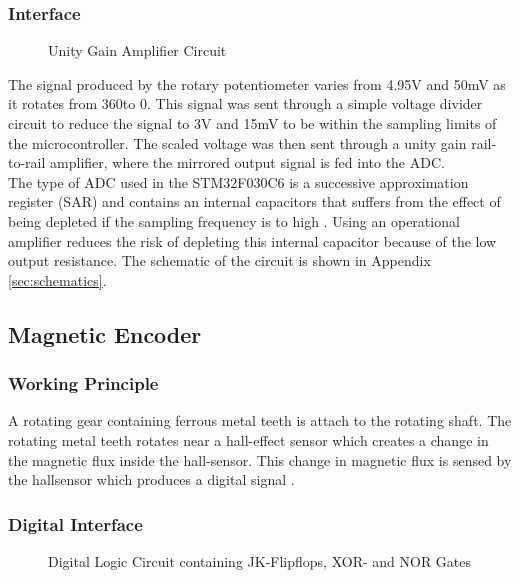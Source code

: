 \subsubsection{Interface}
\begin{figure}[h]
	\centering
	
	\caption{Unity Gain Amplifier Circuit}
	\label{fig:unitygain}
\end{figure}
The signal produced by the rotary potentiometer varies from 4.95V and 50mV as it rotates from 360\textdegree \space to 0\textdegree. This signal was sent through a simple voltage divider circuit to reduce the signal to 3V and 15mV to be within the sampling limits of the microcontroller. The scaled voltage was then sent through a unity gain rail-to-rail amplifier, where the mirrored output signal is fed into the ADC.\\

The type of ADC used in the STM32F030C6 is a successive approximation register (SAR) and contains an internal capacitors that suffers from the effect of being depleted if the sampling frequency is to high \citep{stm32_ADC:2017}. Using an operational amplifier reduces the risk of depleting this internal capacitor because of the low output resistance. The schematic of the circuit is shown in Appendix \ref{sec:schematics}.\\

\subsection{Magnetic Encoder}
\subsubsection{Working Principle}
A rotating gear containing ferrous metal teeth is attach to the rotating shaft. The rotating metal teeth rotates near a hall-effect sensor which creates a change in the magnetic flux inside the hall-sensor. This change in magnetic flux is sensed by the hallsensor which produces a digital signal \citep{hallsensor}.
\subsubsection{Digital Interface} 

\begin{figure}[h]
	\centering
	
	\caption{Digital Logic Circuit containing JK-Flipflops, XOR- and NOR Gates}
	\label{fig:jk_xor}
\end{figure}

